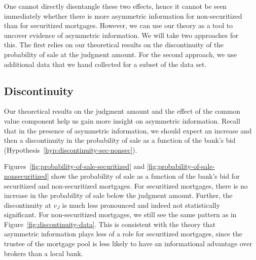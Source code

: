 \documentclass[11pt,twopage]{article}
\begin{document}
One cannot directly disentangle these two effects, hence it cannot be
seen immediately whether there is more asymmetric information for
non-securitized than for securitized mortgages. However, we can use
our theory as a tool to uncover evidence of asymmetric information. We
will take two approaches for this. The first relies on our theoretical
results on the discontinuity of the probability of sale at the judgment amount. For the second
approach, we use additional data that we hand collected for a subset
of the data set.

\subsection{Discontinuity}


Our theoretical results on the judgment amount and the effect of the
common value component help us gain more insight on asymmetric
information. Recall that in the presence of asymmetric information, we
should expect an increase and then a discontinuity in the probability of sale as a function
of the bank's bid (Hypothesis~\ref{hyp:discontinuity-sec-nonsec}).

Figures~\ref{fig:probability-of-sale-securitized} and
\ref{fig:probability-of-sale-nonsecuritized} show the probability of
sale as a function of the bank's bid for securitized
and non-securitized mortgages. For securitized mortgages, there is no increase in the probability of sale below the judgment amount. Further, the discontinuity at $v_J$ is much less pronounced and indeed not statistically significant. For non-securitized mortgages, we still see the same pattern as in Figure~\ref{fig:discontinuity-data}. This is consistent
with the theory that asymmetric information plays less of a role for
securitized mortgages, since the trustee of the mortgage pool is less
likely to have an informational advantage over brokers than a local
bank.
\end{document}
